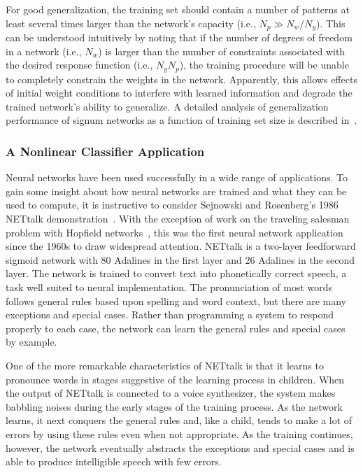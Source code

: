 \documentclass[10pt,twocolumn]{article}
\begin{document}
For good generalization, the training set should contain a number of patterns at
least several times larger than the network's capacity (i.e., $N_p \gg N_w/N_y$).
This can be understood intuitively by noting that if the number of degrees of
freedom in a network (i.e., $N_w$) is larger than the number of constraints
associated with the desired response function (i.e., $N_y N_p$), the training
procedure will be unable to completely constrain the weights in the network.
Apparently, this allows effects of initial weight conditions to interfere with
learned information and degrade the trained network's ability to generalize. A
detailed analysis of generalization performance of signum networks as a function
of training set size is described in~\cite{baumhaussler}.

\subsubsection*{A Nonlinear Classifier Application}
Neural networks have been used successfully in a wide range of applications. To
gain some insight about how neural networks are trained and what they can be used
to compute, it is instructive to consider Sejnowski and Rosenberg's 1986 NETtalk
demonstration~\cite{nettalk2}. With the exception of work on the traveling
salesman problem with Hopfield networks~\cite{hoptank}, this was the first neural
network application since the 1960s to draw widespread attention. NETtalk is a
two-layer feedforward sigmoid network with 80 Adalines in the first layer and 26
Adalines in the second layer. The network is trained to convert text into
phonetically correct speech, a task well suited to neural implementation. The
pronunciation of most words follows general rules based upon spelling and word
context, but there are many exceptions and special cases. Rather than programming
a system to respond properly to each case, the network can learn the general
rules and special cases by example.

One of the more remarkable characteristics of NETtalk is that it learns to
pronounce words in stages suggestive of the learning process in children. When
the output of NETtalk is connected to a voice synthesizer, the system makes
babbling noises during the early stages of the training process. As the network
learns, it next conquers the general rules and, like a child, tends to make a lot
of errors by using these rules even when not appropriate. As the training
continues, however, the network eventually abstracts the exceptions and special
cases and is able to produce intelligible speech with few errors.
\end{document}
